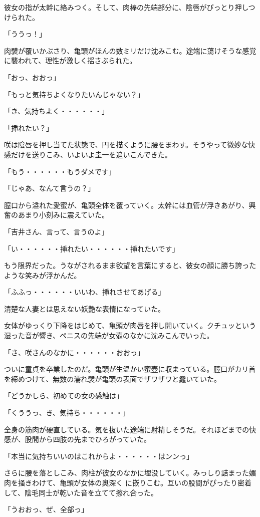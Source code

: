 ﻿\documentclass[book,tate]{jlreq}
\begin{document}
彼女の指が太幹に絡みつく。そして、肉棒の先端部分に、陰唇がぴっとり押しつけられた。

「ううっ！」

肉襞が覆いかぶさり、亀頭がほんの数ミリだけ沈みこむ。途端に蕩けそうな感覚に襲われて、理性が激しく揺さぶられた。

「おっ、おおっ」

「もっと気持ちよくなりたいんじゃない？」

「き、気持ちよく・・・・・・」

「挿れたい？」

咲は陰唇を押し当てた状態で、円を描くように腰をまわす。そうやって微妙な快感だけを送りこみ、いよいよ圭一を追いこんできた。

「もう・・・・・・もうダメです」

「じゃあ、なんて言うの？」

膣口から溢れた愛蜜が、亀頭全体を覆っていく。太幹には血管が浮きあがり、興奮のあまり小刻みに震えていた。

「吉井さん、言って、言うのよ」

「い・・・・・・挿れたい・・・・・・挿れたいです」

もう限界だった。うながされるまま欲望を言葉にすると、彼女の顔に勝ち誇ったような笑みが浮かんだ。

「ふふっ・・・・・・いいわ、挿れさせてあげる」

清楚な人妻とは思えない妖艶な表情になっていた。

女体がゆっくり下降をはじめて、亀頭が肉唇を押し開いていく。クチュッという湿った音が響き、ペニスの先端が女壺のなかに沈みこんでいった。

「さ、咲さんのなかに・・・・・・おおっ」

ついに童貞を卒業したのだ。亀頭が生温かい蜜壺に収まっている。膣口がカリ首を締めつけて、無数の濡れ襞が亀頭の表面でザワザワと蠢いていた。

「どうかしら、初めての女の感触は」

「くううっ、き、気持ち・・・・・・」

全身の筋肉が硬直している。気を抜いた途端に射精しそうだ。それほどまでの快感が、股間から四肢の先までひろがっていた。

「本当に気持ちいいのはこれからよ・・・・・・はンンっ」

さらに腰を落としこみ、肉柱が彼女のなかに埋没していく。みっしり詰まった媚肉を掻きわけて、亀頭が女体の奥深く に嵌りこむ。互いの股間がぴったり密着して、陰毛同士が乾いた音を立てて擦れ合った。

「うおおっ、ぜ、全部っ」
\end{document}
